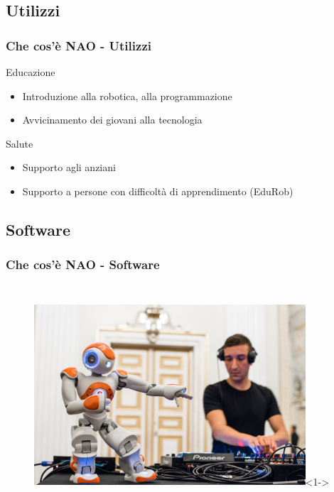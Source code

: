 \documentclass[aspectratio=169]{beamer}
\begin{document}
\subsection{Utilizzi}

\begin{frame}
\frametitle{Che cos'è NAO - Utilizzi}
Educazione
\begin{itemize}
	\item<2-> Introduzione alla robotica, alla programmazione
	\item<3-> Avvicinamento dei giovani alla tecnologia
\end{itemize}
Salute
\begin{itemize}
	\item<4-> Supporto agli anziani
	\item<5-> Supporto a persone con difficoltà di apprendimento (EduRob)
\end{itemize}
\end{frame}

\subsection{Software}

\begin{frame}
\frametitle{Che cos'è NAO - Software}
\begin{columns}



		\begin{figure}[ht]
		\begin{center}
		\includegraphics[width=0.9\textwidth]{nao7.jpg}<1->
		\end{center}
		\end{figure}
\end{columns}
\end{frame}

\ifx\fulldocument\undefined
\end{document}
